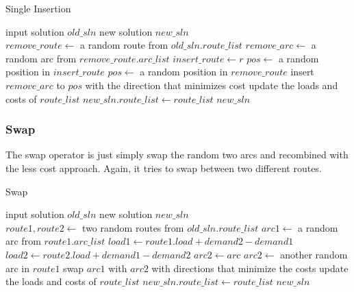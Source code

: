\documentclass[9pt,shortpaper,twoside,web]{ieeecolor}
\begin{document}
\begin{algorithm}
 \caption{Single Insertion}
 \begin{algorithmic}[h]
 \renewcommand{\algorithmicrequire}{\textbf{Input:}}
 \renewcommand{\algorithmicensure}{\textbf{Output:}}
 \REQUIRE input solution $old\_sln$ 
 \ENSURE  new solution $new\_sln$\\ 
 \STATE $remove\_route\gets$ a random route from $old\_sln.route\_list$
 \STATE $remove\_arc\gets$ a random arc from $remove\_route.arc\_list$
 \STATE $insert\_route\gets r$ 
 \ENDIF
 \ENDFOR
 \STATE $pos\gets$ a random position in $insert\_route$ 
 \ELSE
 \STATE $pos\gets$ a random position in $remove\_route$ 
 \STATE insert $remove\_arc$ to $pos$ with the direction that minimizes cost
 \ENDIF
 \STATE update the loads and costs of $route\_list$ 
 \STATE $new\_sln.route\_list\gets route\_list$ 
 \RETURN $new\_sln$
 \end{algorithmic} 
 \end{algorithm}

\subsubsection{Swap}
The swap operator is just simply swap the random two arcs and recombined with the less cost approach. Again, it tries to swap between two different routes. 

\begin{algorithm}
 \caption{Swap}
 \begin{algorithmic}[h]
 \renewcommand{\algorithmicrequire}{\textbf{Input:}}
 \renewcommand{\algorithmicensure}{\textbf{Output:}}
 \REQUIRE input solution $old\_sln$ 
 \ENSURE  new solution $new\_sln$\\ 
 \STATE $route1, route2\gets$ two random routes from $old\_sln.route\_list$
 \STATE $arc1\gets$ a random arc from $route1.arc\_list$
 \STATE $load1\gets route1.load+demand2-demand1$
 \STATE $load2\gets route2.load+demand1-demand2$
 \STATE $arc2\gets arc$ 
 \ENDIF
 \ENDFOR
 \STATE $arc2\gets$ another random arc in $route1$ 
 \ENDIF
 \STATE swap $arc1$ with $arc2$ with directions that minimize the costs
 \STATE update the loads and costs of $route\_list$ 
 \STATE $new\_sln.route\_list\gets route\_list$ 
 \RETURN $new\_sln$
 \end{algorithmic} 
 \end{algorithm}
 
\end{document}
